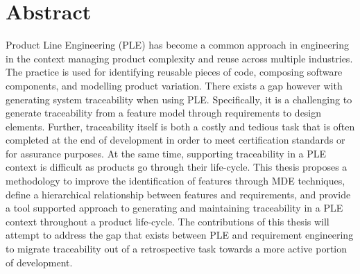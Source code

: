\chapter*{Abstract}

Product Line Engineering (PLE) has become a common approach in engineering in the context managing product complexity and reuse across multiple industries. The practice is used for identifying reusable pieces of code, composing software components, and modelling product variation. There exists a gap however with generating system traceability when using PLE. Specifically, it is a challenging to generate traceability from a feature model through requirements to design elements. Further, traceability itself is both a costly and tedious task that is often completed at the end of development in order to meet certification standards or for assurance purposes. At the same time, supporting traceability in a PLE context is difficult as products go through their life-cycle. This thesis proposes a methodology to improve the identification of features through \ac{MDE} techniques, define a hierarchical relationship between features and requirements, and provide a tool supported approach to generating and maintaining traceability in a PLE context throughout a product life-cycle. The contributions of this thesis will attempt to address the gap that exists between \ac{PLE} and requirement engineering to migrate traceability out of a retrospective task towards a more active portion of development.
